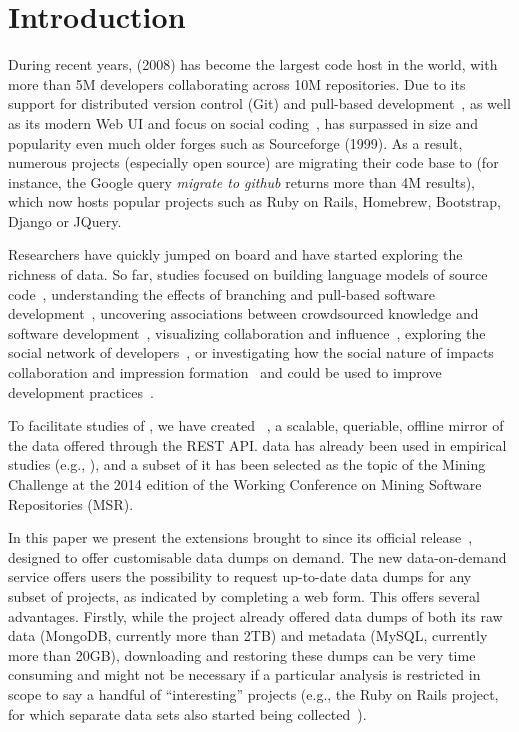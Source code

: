 
\section{Introduction}
\label{sec:intro}

During recent years, \gh (2008) has become the largest code host in the world, with more than 5M developers
collaborating across 10M repositories.
Due to its support for distributed version control (Git) and pull-based development~\cite{barr2012cohesive}, 
as well as its modern Web UI and focus on social coding~\cite{dabbish2012social}, \gh has surpassed in size
and popularity even much older forges such as Sourceforge (1999).
As a result, numerous projects (especially open source) are migrating their code base to \gh (for instance, 
the Google query \emph{migrate to github} returns more than 4M results), which now hosts popular projects
such as Ruby on Rails, Homebrew, Bootstrap, Django or JQuery.

Researchers have quickly jumped on board and have started exploring the richness of \gh data.
So far, studies focused on 
building language models of source code~\cite{allamanis2013mining}, 
understanding the effects of branching and pull-based software development~\cite{lee2013git, gousios2014exploratory}, 
uncovering associations between crowdsourced knowledge and software development~\cite{vasilescu2013stackoverflow},
visualizing collaboration and influence~\cite{heller2011visualizing}, 
exploring the social network of developers~\cite{thung2013network, schall2013follow, jiang2013understanding},
or investigating how the social nature of \gh impacts collaboration and impression formation~\cite{dabbish2012social, marlow2013impression}
and could be used to improve development practices~\cite{pham2013creating, pham2013building}.

To facilitate studies of \gh, we have created \ght~\cite{gousios2012ghtorrent, gousios2013ghtorent}, a scalable, 
queriable, offline mirror of the data offered through the \gh REST API.
\ght data has already been used in empirical studies (e.g., \cite{gousios2014exploratory, squire2014forge, 
vasilescu2013stackoverflow}), and a subset of it has been selected as the topic of the Mining Challenge
at the 2014 edition of the Working Conference on Mining Software Repositories (MSR).

In this paper we present the extensions brought to \ght since its official release~\cite{gousios2013ghtorent},
designed to offer customisable data dumps on demand.
The new \ght data-on-demand service offers users the possibility to request up-to-date \ght data dumps for 
any subset of \gh projects, as indicated by completing a web form.
This offers several advantages.
Firstly, while the \ght project already offered data dumps of both its raw data (MongoDB, currently more than 2TB) 
and metadata (MySQL, currently more than 20GB), downloading and restoring these dumps can be 
very time consuming and might not be necessary if a particular analysis is restricted in scope to say a handful
of ``interesting'' \gh projects (e.g., the Ruby on Rails project, for which separate data sets also started being 
collected~\cite{wagstrom2013network}).

